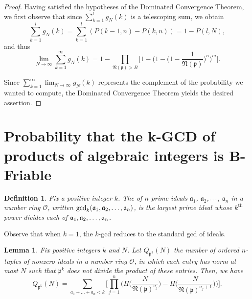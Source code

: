 \documentclass[12pt]{amsart}
\newtheorem{lemma}[theorem]{Lemma}
\newtheorem{definition}[theorem]{Definition}
\theoremstyle{definition}
\newcommand{\f}[1]{\mathfrak{#1}}
\begin{document}
\begin{proof}
	Having satisfied the hypotheses of the Dominated Convergence Theorem, we first observe that since $\sum_{k=1}^l g_N(k)$ is a telescoping sum, we obtain
	$$\sum_{k=1}^l g_N(k) = \sum_{k=1}^l (P(k-1, n) - P(k, n)) = 1 - P(l,N),$$ 
	and thus
	$$\lim_{N \to \infty} \sum_{k=1}^{\infty} g_N(k) = 1 - \prod_{\mathfrak{N}(\mathfrak{p}) > B} \Big[1 - \Big(1 - \Big(1 - \frac{1}{\mathfrak{N}(\mathfrak{p})}  \Big)^n\Big)^m\Big].$$
	
	\noindent Since $\displaystyle \sum_{k=1}^{\infty} \lim_{N \to \infty} g_N(k)$ represents the complement of the probability we wanted to compute, the Dominated Convergence Theorem yields the desired assertion.
\end{proof}


\section{Probability that the k-GCD of products of algebraic integers is B-Friable}

\begin{definition} Fix a positive integer $k$. The  of $n$ prime ideals $\f{a}_1$, $\f{a}_2$,$\mathellipsis$, $\f{a}_n$ in a number ring $\mathcal{O}$, written $\gcd_k(\f{a}_1,\f{a}_2, \mathellipsis,\f{a}_n)$, is the largest prime ideal whose $k^{\text{th}}$ power divides each of $\f{a}_1, \f{a}_2,\mathellipsis, \f{a}_n$.
\end{definition}	

\noindent Observe that when $k=1$, the $k$-gcd reduces to the standard gcd of ideals.

\begin{lemma}
	Fix positive integers $k$ and $N$. Let $Q_{\f{p}^k}(N)$ the number of ordered $n$-tuples of nonzero ideals in a number ring $\mathcal{O}$, in which each entry has norm at most $N$ such that $\f{p}^k$ does not divide the product of these entries. Then, we have
	$$Q_{\f{p}^k}(N) = \sum_{a_1+...+a_n < k} \Big[\prod_{j=1}^n \Big(H\bigg( \frac{N}{\f{N}(\f{p})^{a_j}}\bigg) - H\bigg(\frac{N}{\f{N}(\f{p})^{a_j + 1}}\bigg)\Big)\Big].$$
\end{lemma}
\end{document}
